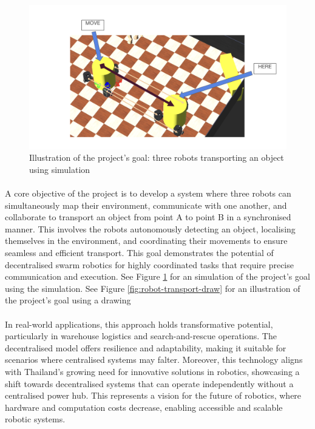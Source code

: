 \begin{figure} [H]
    \centering
    \includegraphics[width=1.0\linewidth]{assets/images/introduction/robot-transport-sim.png}
    \caption{Illustration of the project's goal: three robots transporting an object using simulation}
    \label{fig:robot-transport-sim}
\end{figure}

\paragraph*{}
A core objective of the project is to develop a system where three robots can simultaneously map their environment, communicate with one another, and collaborate to transport an object from point A to point B in a synchronised manner. This involves the robots autonomously detecting an object, localising themselves in the environment, and coordinating their movements to ensure seamless and efficient transport. This goal demonstrates the potential of decentralised swarm robotics for highly coordinated tasks that require precise communication and execution. See Figure \ref{fig:robot-transport-sim} for an simulation of the project's goal using the simulation.
See Figure \ref{fig:robot-transport-draw} for an illustration of the project's goal using a drawing 

\paragraph*{}
In real-world applications, this approach holds transformative potential, particularly in warehouse logistics and search-and-rescue operations. The decentralised model offers resilience and adaptability, making it suitable for scenarios where centralised systems may falter. Moreover, this technology aligns with Thailand’s growing need for innovative solutions in robotics, showcasing a shift towards decentralised systems that can operate independently without a centralised power hub. This represents a vision for the future of robotics, where hardware and computation costs decrease, enabling accessible and scalable robotic systems.

